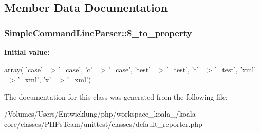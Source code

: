 \subsection{Member Data Documentation}
\hypertarget{class_simple_command_line_parser_a155abe2c627c6dcd7edfeb62e3ab6980}{
\subsubsection[{\$\_\-to\_\-property}]{\setlength{\rightskip}{0pt plus 5cm}SimpleCommandLineParser::\$\_\-to\_\-property}}
\label{class_simple_command_line_parser_a155abe2c627c6dcd7edfeb62e3ab6980}
{\bfseries Initial value:}
\begin{DoxyCode}
 array(
            'case' => '_case', 'c' => '_case',
            'test' => '_test', 't' => '_test',
            'xml' => '_xml', 'x' => '_xml')
\end{DoxyCode}


The documentation for this class was generated from the following file:\begin{DoxyCompactItemize}
\item 
/Volumes/Users/Entwicklung/php/workspace\_\-koala\_/koala-\/core/classes/PHPsTeam/unittest/classes/default\_\-reporter.php\end{DoxyCompactItemize}
